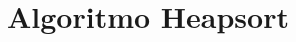 \section[Algoritmo Heapsort]{Algoritmo Heapsort}
\begin{frame}[plain]
%	
%	
%			
%		
		
\end{frame}
		
\begin{frame}[plain]
%	
%	
%	
\end{frame}	